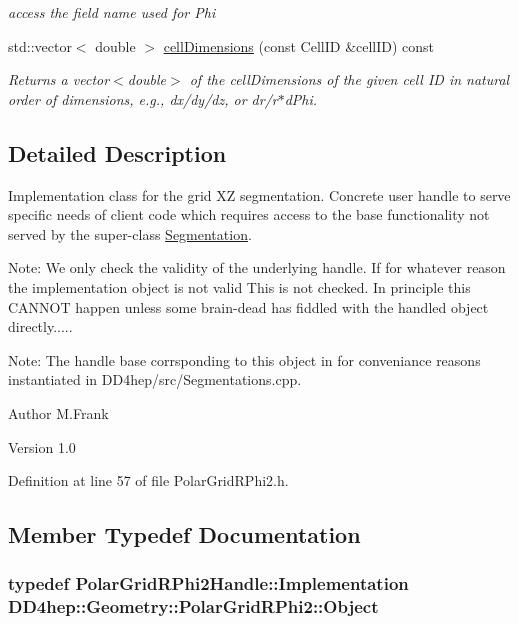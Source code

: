 \begin{DoxyCompactItemize}
\begin{DoxyCompactList}\small\item\em access the field name used for Phi \item\end{DoxyCompactList}\item 
std::vector$<$ double $>$ \hyperlink{class_d_d4hep_1_1_geometry_1_1_polar_grid_r_phi2_a4955e146ca59fb57fbb9bf999de56c4c}{cellDimensions} (const CellID \&cellID) const 
\begin{DoxyCompactList}\small\item\em Returns a vector$<$double$>$ of the cellDimensions of the given cell ID in natural order of dimensions, e.g., dx/dy/dz, or dr/r$\ast$dPhi. \item\end{DoxyCompactList}\end{DoxyCompactItemize}


\subsection{Detailed Description}
Implementation class for the grid XZ segmentation. Concrete user handle to serve specific needs of client code which requires access to the base functionality not served by the super-\/class \hyperlink{class_d_d4hep_1_1_geometry_1_1_segmentation}{Segmentation}.

Note: We only check the validity of the underlying handle. If for whatever reason the implementation object is not valid This is not checked. In principle this CANNOT happen unless some brain-\/dead has fiddled with the handled object directly.....

Note: The handle base corrsponding to this object in for conveniance reasons instantiated in DD4hep/src/Segmentations.cpp.

\begin{DoxyAuthor}{Author}
M.Frank 
\end{DoxyAuthor}
\begin{DoxyVersion}{Version}
1.0 
\end{DoxyVersion}


Definition at line 57 of file PolarGridRPhi2.h.

\subsection{Member Typedef Documentation}
\hypertarget{class_d_d4hep_1_1_geometry_1_1_polar_grid_r_phi2_a1067131b00d726a9739132de2eea6d86}{
\subsubsection[{Object}]{\setlength{\rightskip}{0pt plus 5cm}typedef {\bf PolarGridRPhi2Handle::Implementation} {\bf DD4hep::Geometry::PolarGridRPhi2::Object}}}
\label{class_d_d4hep_1_1_geometry_1_1_polar_grid_r_phi2_a1067131b00d726a9739132de2eea6d86}


